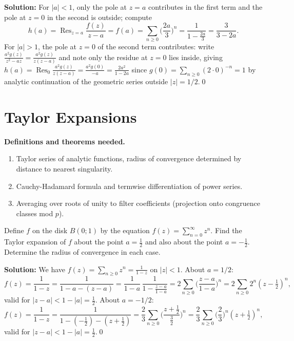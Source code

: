 \noindent\textbf{Solution:}
For $|a|<1$, only the pole at $z=a$ contributes in the first term and the pole at $z=0$ in the second is outside; compute
\[h(a)=\operatorname{Res}_{z=a}\frac{f(z)}{z-a}=f(a)=\sum_{n\ge0}\Big(\frac{2a}{3}\Big)^n=\frac{1}{1-\frac{2a}{3}}=\frac{3}{3-2a}.
\]
For $|a|>1$, the pole at $z=0$ of the second term contributes: write $\frac{a^2g(z)}{z^2-az}=\frac{a^2g(z)}{z(z-a)}$ and note only the residue at $z=0$ lies inside, giving $h(a)=\operatorname{Res}_{0}\frac{a^2g(z)}{z(z-a)}=\frac{a^2g(0)}{-a}=\frac{2a^2}{1-2a}$ since $g(0)=\sum_{n\ge0} (2\cdot0)^{-n}=1$ by analytic continuation of the geometric series outside $|z|=1/2$.\qed
\section{Taylor Expansions}

\noindent\textbf{Definitions and theorems needed.}
\begin{enumerate}[label=(\alph*)]
\item Taylor series of analytic functions, radius of convergence determined by distance to nearest singularity.
\item Cauchy-Hadamard formula and termwise differentiation of power series.
\item Averaging over roots of unity to filter coefficients (projection onto congruence classes mod $p$).
\end{enumerate}



\begin{problembox}
Define \( f \) on the disk \( B(0; 1) \) by the equation \( f(z) = \sum_{n=0}^{\infty} z^n \). Find the Taylor expansion of \( f \) about the point \( a = \frac{1}{2} \) and also about the point \( a = -\frac{1}{2} \). Determine the radius of convergence in each case.
\end{problembox}

\noindent\textbf{Solution:}
We have $f(z)=\sum_{n\ge0}z^n=\frac{1}{1-z}$ on $|z|<1$. About $a=1/2$:
\[f(z)=\frac{1}{1-z}=\frac{1}{1-a-(z-a)}=\frac{1}{1-a}\,\frac{1}{1-\frac{z-a}{1-a}}=2\sum_{n\ge0}\Big(\frac{z-a}{1-a}\Big)^n=2\sum_{n\ge0}2^n(z-\tfrac12)^n,
\]
valid for $|z-a|<1-|a|=\tfrac12$. About $a=-1/2$:
\[f(z)=\frac{1}{1-z}=\frac{1}{1-(-\tfrac12)-(z+\tfrac12)}=\frac{2}{3}\sum_{n\ge0}\Big(\frac{z+\tfrac12}{\tfrac32}\Big)^n=\frac{2}{3}\sum_{n\ge0}\Big(\frac{2}{3}\Big)^n(z+\tfrac12)^n,
\]
valid for $|z-a|<1-|a|=\tfrac12$.\qed


